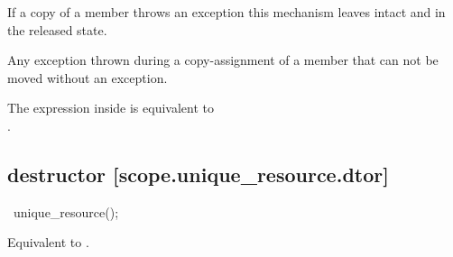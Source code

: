 \documentclass[ebook,11pt,article]{memoir}
\begin{document}
\begin{itemdescr}
%

\pnum
\begin{note}
If a copy of a member throws an exception this mechanism leaves  intact and  in the released state.
\end{note}

\pnum
\throws Any exception thrown during a copy-assignment of a member that can not be moved without an exception.

\pnum
\remarks
The expression inside  is equivalent to \\
 \tcode{\&\&} .
\end{itemdescr}


\subsection { destructor [scope.unique_resource.dtor]}

\begin{itemdecl}
~unique_resource();
\end{itemdecl}

\begin{itemdescr}
\pnum
\effects 
Equivalent to .
\end{itemdescr}
\end{document}
